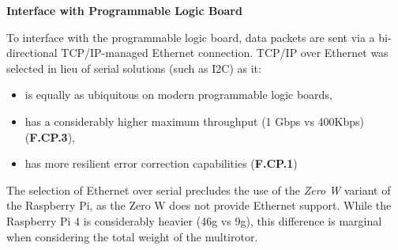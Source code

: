 \textbf{Interface with Programmable Logic Board}

To interface with the programmable logic board, data packets are sent via a bi-directional TCP/IP-managed Ethernet connection. TCP/IP over Ethernet was selected in lieu of serial solutions (such as I2C) as it:
\begin{itemize}
\item is equally as ubiquitous on modern programmable logic boards,
\item has a considerably higher maximum throughput (1 Gbps vs 400Kbps) (\textbf{F.CP.3}),
\item has more resilient error correction capabilities (\textbf{F.CP.1})
\end{itemize} 

The selection of Ethernet over serial precludes the use of the \textit{Zero W} variant of the Raspberry Pi, as the Zero W does not provide Ethernet support. While the Raspberry Pi 4 is considerably heavier (46g vs 9g), this difference is marginal when considering the total weight of the multirotor.




